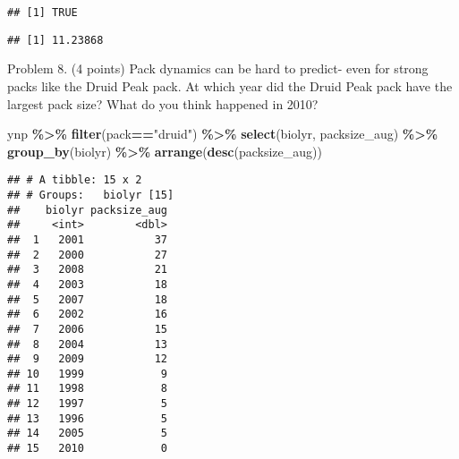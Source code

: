 \documentclass[
]{article}
\newenvironment{Shaded}{\begin{snugshade}}{\end{snugshade}}
\newcommand{\AttributeTok}[1]{\textcolor[rgb]{0.13,0.29,0.53}{#1}}
\newcommand{\FunctionTok}[1]{\textcolor[rgb]{0.13,0.29,0.53}{\textbf{#1}}}
\newcommand{\NormalTok}[1]{#1}
\newcommand{\SpecialCharTok}[1]{\textcolor[rgb]{0.81,0.36,0.00}{\textbf{#1}}}
\newcommand{\StringTok}[1]{\textcolor[rgb]{0.31,0.60,0.02}{#1}}
\begin{document}
\begin{Shaded}
\end{Shaded}

\begin{verbatim}
## [1] TRUE
\end{verbatim}

\begin{Shaded}
\end{Shaded}

\begin{verbatim}
## [1] 11.23868
\end{verbatim}

Problem 8. (4 points) Pack dynamics can be hard to predict- even for
strong packs like the Druid Peak pack. At which year did the Druid Peak
pack have the largest pack size? What do you think happened in 2010?

\begin{Shaded}
\begin{Highlighting}[]
\NormalTok{ynp }\SpecialCharTok{\%\textgreater{}\%} 
  \FunctionTok{filter}\NormalTok{(pack}\SpecialCharTok{==}\StringTok{"druid"}\NormalTok{) }\SpecialCharTok{\%\textgreater{}\%} 
  \FunctionTok{select}\NormalTok{(biolyr, packsize\_aug) }\SpecialCharTok{\%\textgreater{}\%} 
  \FunctionTok{group\_by}\NormalTok{(biolyr) }\SpecialCharTok{\%\textgreater{}\%} 
  \FunctionTok{arrange}\NormalTok{(}\FunctionTok{desc}\NormalTok{(packsize\_aug))}
\end{Highlighting}
\end{Shaded}

\begin{verbatim}
## # A tibble: 15 x 2
## # Groups:   biolyr [15]
##    biolyr packsize_aug
##     <int>        <dbl>
##  1   2001           37
##  2   2000           27
##  3   2008           21
##  4   2003           18
##  5   2007           18
##  6   2002           16
##  7   2006           15
##  8   2004           13
##  9   2009           12
## 10   1999            9
## 11   1998            8
## 12   1997            5
## 13   1996            5
## 14   2005            5
## 15   2010            0
\end{verbatim}
\end{document}
